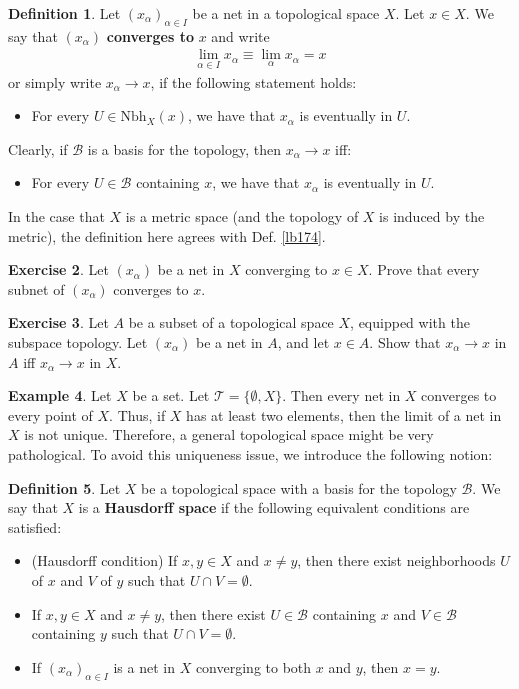 \documentclass[12pt,b5paper,notitlepage]{article}
\theoremstyle{definition}
\newtheorem{df}{Definition}[section]
\newtheorem{eg}[df]{Example}
\newtheorem{exe}[df]{Exercise}
\theoremstyle{plain}
\newcommand{\mc}{\mathcal}
\newcommand{\Nbh}{\mathrm{Nbh}}
\numberwithin{equation}{section}
\begin{document}
\begin{df}
Let $(x_\alpha)_{\alpha\in I}$ be a net in a topological space $X$. Let $x\in X$. We say that $(x_\alpha)$ \textbf{converges to} $x$ and write 
\begin{align*}
\lim_{\alpha\in I}x_\alpha\equiv \lim_\alpha x_\alpha=x
\end{align*}
or simply write $x_\alpha\rightarrow x$, if the following statement holds:
\begin{itemize}
\item For every $U\in\Nbh_X(x)$, we have that $x_\alpha$ is eventually in $U$.
\end{itemize}
Clearly, if $\mc B$ is a basis for the topology, then $x_\alpha\rightarrow x$ iff:
\begin{itemize}
\item For every $U\in\mc B$ containing $x$, we have that $x_\alpha$ is eventually in $U$.
\end{itemize}
In the case that $X$ is a metric space (and the topology of $X$ is induced by the metric), the definition here agrees with Def. \ref{lb174}.
\end{df}

\begin{exe}
Let $(x_\alpha)$ be a net in $X$ converging to $x\in X$. Prove that every subnet of $(x_\alpha)$ converges to $x$.
\end{exe}

\begin{exe}
Let $A$ be a subset of a topological space $X$, equipped with the subspace topology. Let $(x_\alpha)$ be a net in $A$, and let $x\in A$. Show that $x_\alpha\rightarrow x$ in $A$ iff $x_\alpha\rightarrow x$ in $X$.
\end{exe}




\begin{eg}
Let $X$ be a set. Let $\mc T=\{\emptyset,X\}$. Then every net in $X$ converges to every point of $X$. Thus, if $X$ has at least two elements, then the limit of a net in $X$ is not unique. Therefore, a general topological space might be very pathological. To avoid this uniqueness issue, we introduce the following notion:
\end{eg}



\begin{df}\label{lb268}
Let $X$ be a topological space with a basis for the topology $\mc B$. We say that $X$ is a \textbf{Hausdorff space} if the following equivalent conditions are satisfied:
\begin{itemize}
\item[(1)] (Hausdorff condition) If $x,y\in X$ and $x\neq y$, then there exist neighborhoods $U$ of $x$ and $V$ of $y$ such that $U\cap V=\emptyset$.
\item[(1')] If $x,y\in X$ and $x\neq y$, then there exist $U\in\mc B$ containing $x$ and $V\in\mc B$ containing $y$ such that $U\cap V=\emptyset$.
\item[(2)] If $(x_\alpha)_{\alpha\in I}$ is a net in $X$ converging to both $x$ and $y$, then $x=y$.
\end{itemize}
\end{df}
\end{document}
